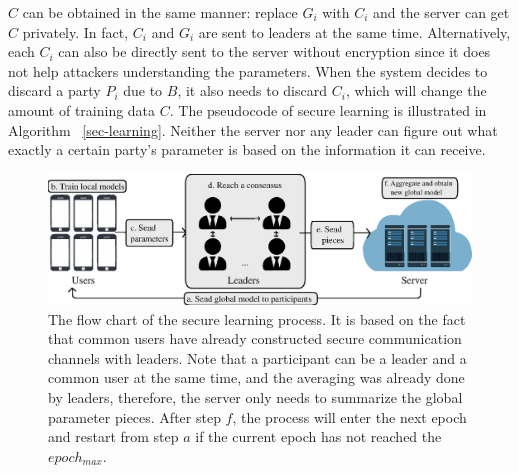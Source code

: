 $C$ can be obtained in the same manner: replace $G_i$ with $C_i$ and the server can get $C$ privately. In fact, $C_i$ and $G_i$ are sent to leaders at the same time. Alternatively, each $C_i$ can also be directly sent to the server without encryption since it does not help attackers understanding the parameters. When the system decides to discard a party $P_i$ due to $B$, it also needs to discard $C_i$, which will change the amount of training data $C$. The pseudocode of secure learning is illustrated in Algorithm ~\ref{sec-learning}. Neither the server nor any leader can figure out what exactly a certain party's parameter is based on the information it can receive. 

\begin{figure}[!ht]
    \centering
    \includegraphics[width=1.8\columnwidth]{img/alg.eps}
    \caption{The flow chart of the secure learning process. It is based on the fact that common users have already constructed secure communication channels with leaders. Note that a participant can be a leader and a common user at the same time, and the averaging was already done by leaders, therefore, the server only needs to summarize the global parameter pieces. After step $f$, the process will enter the next epoch and restart from step $a$ if the current epoch has not reached the $epoch_{max}$.}
    \label{fig-alg}
\end{figure}

